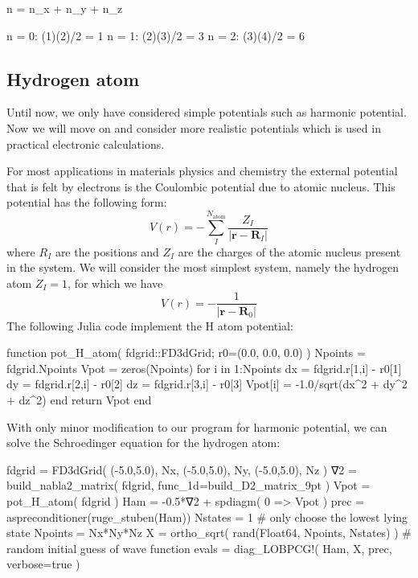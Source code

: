 \begin{textcode}
n = n_x + n_y + n_z

n = 0: (1)(2)/2 = 1
n = 1: (2)(3)/2 = 3
n = 2: (3)(4)/2 = 6
\end{textcode}

\subsection{Hydrogen atom}

Until now, we only have considered simple potentials such as harmonic potential. Now we will
move on and consider more realistic potentials which is used in practical electronic calculations.

For most applications in materials physics and chemistry the external potential that is
felt by electrons is the Coulombic potential due to atomic nucleus. This potential has
the following form:
\begin{equation}
V(r) = -\sum_{I}^{N_{\mathrm{atom}}} \frac{Z_{I}}{\left|\mathbf{r} - \mathbf{R}_{I}\right|}
\end{equation}
where $R_{I}$ are the positions and $Z_{I}$ are the charges
of the atomic nucleus present in the system.
%
We will consider the most simplest system, namely the hydrogen atom $Z_{I}=1$, for which we have
\begin{equation}
V(r) = -\frac{1}{\left|\mathbf{r} - \mathbf{R}_{0}\right|}
\end{equation}
%
The following Julia code implement the H atom potential:
\begin{juliacode}
function pot_H_atom( fdgrid::FD3dGrid; r0=(0.0, 0.0, 0.0) )
    Npoints = fdgrid.Npoints
    Vpot = zeros(Npoints)
    for i in 1:Npoints
        dx = fdgrid.r[1,i] - r0[1]
        dy = fdgrid.r[2,i] - r0[2]
        dz = fdgrid.r[3,i] - r0[3]
        Vpot[i] = -1.0/sqrt(dx^2 + dy^2 + dz^2)
    end
    return Vpot
end
\end{juliacode}

With only minor modification to our program for harmonic potential, we can solve the Schroedinger
equation for the hydrogen atom:
\begin{juliacode}
fdgrid = FD3dGrid( (-5.0,5.0), Nx, (-5.0,5.0), Ny, (-5.0,5.0), Nz )
∇2 = build_nabla2_matrix( fdgrid, func_1d=build_D2_matrix_9pt )
Vpot = pot_H_atom( fdgrid )
Ham = -0.5*∇2 + spdiagm( 0 => Vpot )
prec = aspreconditioner(ruge_stuben(Ham))
Nstates = 1  # only choose the lowest lying state
Npoints = Nx*Ny*Nz
X = ortho_sqrt( rand(Float64, Npoints, Nstates) ) # random initial guess of wave function
evals = diag_LOBPCG!( Ham, X, prec, verbose=true )
\end{juliacode}

